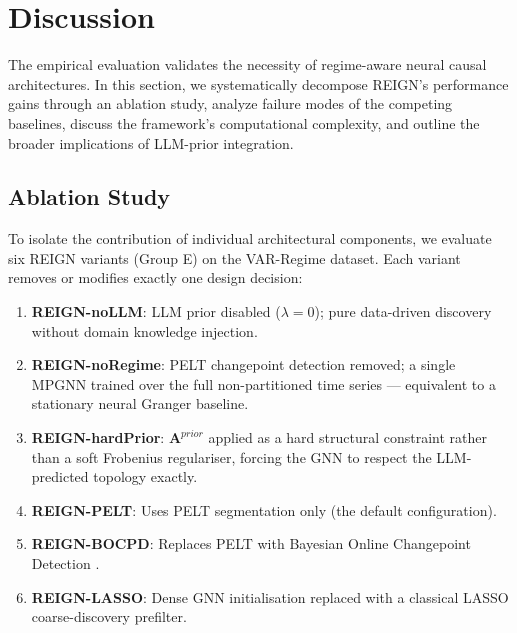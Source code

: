 \section{Discussion}

The empirical evaluation validates the necessity of regime-aware neural causal architectures. In this section, we systematically decompose REIGN's performance gains through an ablation study, analyze failure modes of the competing baselines, discuss the framework's computational complexity, and outline the broader implications of LLM-prior integration.

\subsection{Ablation Study}
\label{sec:ablation}

To isolate the contribution of individual architectural components, we evaluate six REIGN variants (Group E) on the VAR-Regime dataset. Each variant removes or modifies exactly one design decision:

\begin{enumerate}
    \item \textbf{REIGN-noLLM}: LLM prior disabled ($\lambda=0$); pure data-driven discovery without domain knowledge injection.
    \item \textbf{REIGN-noRegime}: PELT changepoint detection removed; a single MPGNN trained over the full non-partitioned time series — equivalent to a stationary neural Granger baseline.
    \item \textbf{REIGN-hardPrior}: $\mathbf{A}^{prior}$ applied as a hard structural constraint rather than a soft Frobenius regulariser, forcing the GNN to respect the LLM-predicted topology exactly.
    \item \textbf{REIGN-PELT}: Uses PELT segmentation only (the default configuration).
    \item \textbf{REIGN-BOCPD}: Replaces PELT with Bayesian Online Changepoint Detection \cite{Deasy2023}.
    \item \textbf{REIGN-LASSO}: Dense GNN initialisation replaced with a classical LASSO coarse-discovery prefilter.
\end{enumerate}

